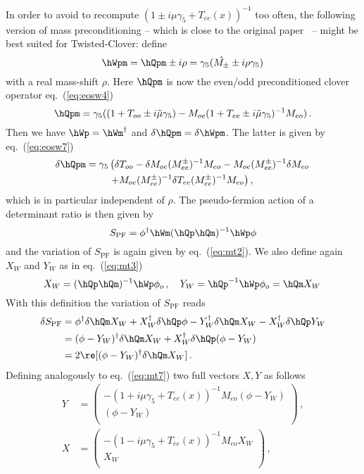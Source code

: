 In order to avoid to recompute $(1\pm i \mu\gamma_5 + T_{ee}(x))^{-1}$
too often, the following version of mass preconditioning -- which is
close to the original paper~\cite{Hasenbusch:2002ai} -- might be best
suited for Twisted-Clover: define
\begin{equation}
  \label{eq:swWhat}
  \hWpm = \hQpm \pm i \rho = \gamma_5(\hat{M_\pm} \pm i \rho\gamma_5)
\end{equation}
with a real mass-shift $\rho$. Here $\hQpm$ is now the even/odd
preconditioned clover operator eq.~(\ref{eq:eosw4})
\[
\hQpm = \gamma_5((1 + T_{oo} \pm i\tilde\mu\gamma_5) -
             M_{oe}( 1 + T_{ee} \pm i\tilde\mu\gamma_5 )^{-1}M_{eo})\,.
\]
Then we have $\hWp = \hWm^\dagger$ and $\delta \hQpm =
\delta\hWpm$. The latter is given by eq.~(\ref{eq:eosw7})
\begin{equation*}
  \begin{split}
    \delta \hQpm = \gamma_5 & \left( \delta T_{oo}-\delta M_{oe}(M_{ee}^\pm )^{-1}M_{eo} -
      M_{oe}(M_{ee}^\pm )^{-1}\delta M_{eo}\right. \\
  &\left. + M_{oe}(M_{ee}^\pm )^{-1} \delta T_{ee} (M_{ee}^\pm )^{-1} M_{eo}\right),
  \end{split}
\end{equation*}
which is in particular independent of $\rho$. 
The pseudo-fermion action of a determinant ratio is then
given by
\[
S_\mathrm{PF} = \phi^\dagger\hWm(\hQp\hQm)^{-1}\hWp\phi
\]
and the variation of $S_\mathrm{PF}$ is again given by
eq.~(\ref{eq:mt2}). We also define again $X_W$ and $Y_W$ as in
eq.~(\ref{eq:mt3})
\begin{equation*}
  X_W = (\hQp\hQm)^{-1}\hWp\phi_o\, ,\quad Y_W = \hQp^{-1}\hWp\phi_o = \hQm
  X_W\, 
\end{equation*}
With this definition the variation of
$S_\mathrm{PF}$ reads
\begin{equation}
  \label{eq:swdeltaS}
  \begin{split}
    \delta S_\mathrm{PF} &= \phi^\dagger\delta\hQm X_W + X_W^\dagger
    \delta \hQp\phi - Y_W^\dagger\delta \hQm X_W - X_W^\dagger\delta\hQp
    Y_W\\
    &= (\phi- Y_W)^\dagger\delta\hQm X_W + X_W^\dagger\delta\hQp(\phi
    - Y_W) \\
    &= 2\re[ (\phi- Y_W)^\dagger\delta\hQm X_W ]\,.
  \end{split}
\end{equation}
Defining analogously to eq.~(\ref{eq:mt7}) two full vectors $X,Y$ as
follows 
\begin{equation}
  \label{eq:swXY}
  \begin{split}
    Y &= 
    \begin{pmatrix}
      -(1+i\mu\gamma_5+T_{ee}(x))^{-1}M_{eo} (\phi-Y_W) \\ (\phi-Y_W)\\
    \end{pmatrix}\, ,\\
    X &= 
    \begin{pmatrix}
      -(1-i\mu\gamma_5+T_{ee}(x))^{-1}M_{eo}X_W \\ X_W\\
    \end{pmatrix}\,,
  \end{split}
\end{equation}
